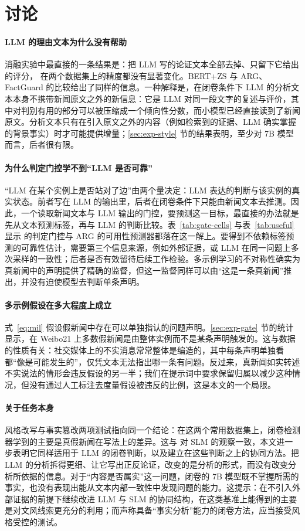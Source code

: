 \section{讨论}\label{sec:discussion}

\paragraph{LLM 的理由文本为什么没有帮助}
消融实验中最直接的一条结果是：把 LLM 写的论证文本全部去掉、只留下它给出的评分，\method{} 在两个数据集上的精度都没有显著变化。BERT+ZS 与 ARG、FactGuard 的比较给出了同样的信息。一种解释是，在闭卷条件下 LLM 的分析文本本身不携带新闻原文之外的新信息：它是 LLM 对同一段文字的复述与评价，其中对判别有用的部分可以被压缩成一个倾向性分数，而小模型已经直接读到了新闻原文。分析文本只有在引入原文之外的内容（例如检索到的证据、LLM 确实掌握的背景事实）时才可能提供增量；\ref{sec:exp-style} 节的结果表明，至少对 7B 模型而言，后者很有限。

\paragraph{为什么判定门控学不到“LLM 是否可靠”}
“LLM 在某个实例上是否站对了边”由两个量决定：LLM 表达的判断与该实例的真实状态。前者写在 LLM 的输出里，后者在闭卷条件下只能由新闻文本去推测。因此，一个读取新闻文本与 LLM 输出的门控，要预测这一目标，最直接的办法就是先从文本预测标签，再与 LLM 的判断比较。表~\ref{tab:gate-cells} 与表~\ref{tab:useful} 显示 \method{} 的判定门控与 ARG 的可用性预测器都落在这一解上。要得到不依赖标签预测的可靠性估计，需要第三个信息来源，例如外部证据，或 LLM 在同一问题上多次采样的一致性；后者是否有效留待后续工作检验。多示例学习的不对称性确实为真新闻中的声明提供了精确的监督，但这一监督同样可以由“这是一条真新闻”推出，并没有迫使模型去判断单条声明。

\paragraph{多示例假设在多大程度上成立}
式~\eqref{eq:mil} 假设假新闻中存在可以单独指认的问题声明。\ref{sec:exp-gate} 节的统计显示，在 Weibo21 上多数假新闻是由整体实例而不是某条声明触发的。这与数据的性质有关：社交媒体上的不实消息常常整体是编造的，其中每条声明单独看都“像是可能发生的”，仅凭文本无法指出哪一条有问题。反过来，真新闻如实转述不实说法的情形会违反假设的另一半；我们在提示词中要求保留归属以减少这种情况，但没有通过人工标注去度量假设被违反的比例，这是本文的一个局限。

\paragraph{关于任务本身}
风格改写与事实篡改两项测试指向同一个结论：在这两个常用数据集上，闭卷检测器学到的主要是真假新闻在写法上的差异。这与 \citet{wu2024sheepdog} 对 SLM 的观察一致，本文进一步表明它同样适用于 LLM 的闭卷判断，以及建立在这些判断之上的协同方法。把 LLM 的分析拆得更细、让它写出正反论证，改变的是分析的形式，而没有改变分析所依据的信息。对于“内容是否属实”这一问题，闭卷的 7B 模型既不掌握所需的事实，也没有表现出能从文本内部一致性中发现问题的能力。这提示：在不引入外部证据的前提下继续改进 LLM 与 SLM 的协同结构，在这类基准上能得到的主要是对文风线索更充分的利用；而声称具备“事实分析”能力的闭卷方法，应当接受风格受控的测试。

